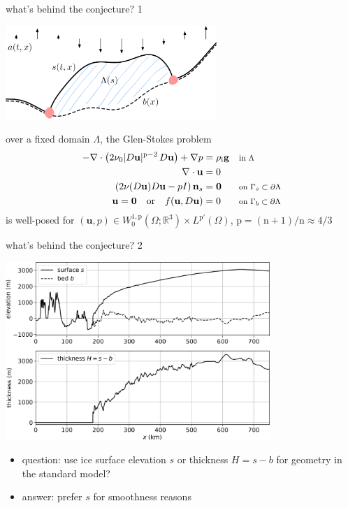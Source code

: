 \documentclass[10pt,dvipsnames]{beamer}
\newcommand{\bg}{\mathbf{g}}
\newcommand{\bn}{\mathbf{n}}
\newcommand{\bu}{\mathbf{u}}
\newcommand{\bzero}{\bm{0}}
\newcommand{\RR}{\mathbb{R}}
\newcommand{\nn}{\mathrm{n}}
\newcommand{\pp}{\mathrm{p}}
\newcommand{\rhoi}{\rho_{\text{i}}}
\newcommand{\where}[1]{\text{\footnotesize #1}}
\begin{document}
\begin{frame}{what's behind the conjecture? 1}

\begin{center}
\includegraphics[width=0.6\textwidth]{stokesdomain}
\end{center}

\begin{theorem}
over a fixed domain $\Lambda$, the Glen-Stokes problem
\begin{align*}
- \nabla \cdot \left(2 \nu_0 |D\bu|^{\pp-2}\, D\bu\right) + \nabla p &= \rhoi \bg && \where{in $\Lambda$} \\
\nabla \cdot \bu &= 0 \\
\left(2 \nu(D\bu) D\bu - pI\right) \bn_s &= \bzero && \where{on $\Gamma_s \subset \partial\Lambda$} \\
\bu  = \bzero \quad \text{or} \quad f(\bu,D\bu) &= 0 && \where{on $\Gamma_b \subset \partial\Lambda$}
\end{align*}
is well-posed for $(\bu,p) \in W^{1,\pp}_0(\Omega;\RR^3) \times L^{\pp'}(\Omega)$, $\pp=(\nn+1)/\nn\approx 4/3$
\end{theorem}
\end{frame}


\begin{frame}{what's behind the conjecture? 2}

\bigskip
\begin{center}
\includegraphics[width=0.75\textwidth]{giscrossALPHA}
\end{center}

\begin{itemize}
\item question: use ice surface elevation $s$ or thickness $H = s - b$ for geometry in the standard model?
\item answer: prefer $s$ for smoothness reasons
\end{itemize}
\end{frame}
\end{document}
